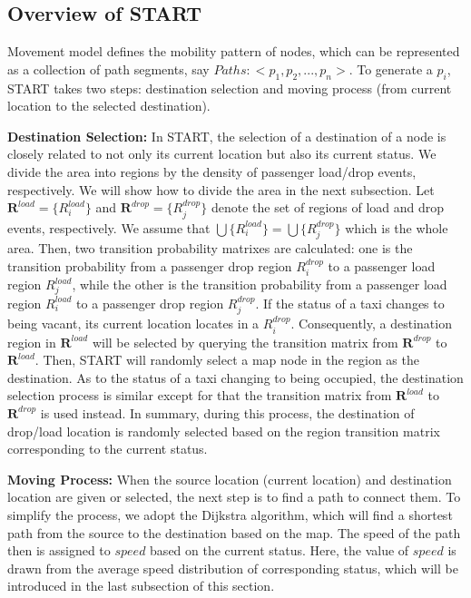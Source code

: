 
\subsection{Overview of START}

Movement model defines the mobility pattern of nodes, which can be represented as a collection of path segments, say $Paths:<p_1,p_2,...,p_n>$.  To generate a $p_i$, START takes two steps: destination selection and moving process (from current location to the selected destination).

\textbf{Destination Selection:} In START, the selection of a destination of a node is closely related to not only its current location but also its current status. We divide the area into regions by the density of passenger load/drop events, respectively. We will show how to divide the area in the next subsection. Let $\textbf{R}^{load}=\{R_i^{load}\}$ and $\textbf{R}^{drop}=\{R_j^{drop}\}$ denote the set of regions of load and drop events, respectively. We assume that $\bigcup\{R_i^{load}\}=\bigcup\{R_j^{drop}\}$ which is the whole area.
Then, two transition probability matrixes are calculated: one is the transition probability from a passenger drop region $R_i^{drop}$ to a passenger load region $R_j^{load}$, while the other is the transition probability from a passenger load region $R_i^{load}$ to a passenger drop region $R_j^{drop}$.
If the status of a taxi changes to being vacant, its current location locates in a $R_i^{drop}$. Consequently, a destination region in $\textbf{R}^{load}$ will be selected by querying the transition matrix from $\textbf{R}^{drop}$ to $\textbf{R}^{load}$. Then, START will randomly select a map node in the region as the destination. As to the status of a taxi changing to being occupied, the destination selection process is similar except for that the transition matrix from $\textbf{R}^{load}$ to $\textbf{R}^{drop}$ is used instead. In summary, during this process, the destination of drop/load location is randomly selected based on the region transition matrix corresponding to the current status.

\textbf{Moving Process:} When the source location (current location) and destination location are given or selected, the next step is to find a path to connect them. To simplify the process, we adopt the Dijkstra algorithm, which will find a shortest path from the source to the destination based on the map. The speed of the path then is assigned to $speed$ based on the current status. Here, the value of $speed$ is drawn from the average speed distribution of corresponding status, which will be introduced in the last subsection of this section.


